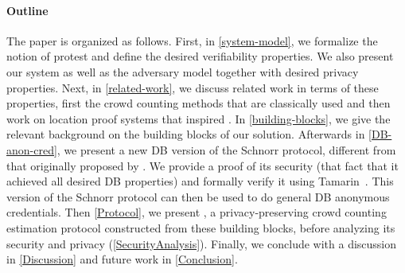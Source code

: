 \paragraph*{Outline}

The paper is organized as follows.
First, in \cref{system-model}, we formalize the notion of protest and define the desired verifiability properties.
We also present our system as well as the adversary model together with desired privacy properties.
Next, in \cref{related-work}, we discuss related work in terms of these properties, first the crowd counting methods that are classically used and then work on location proof systems that inspired \CROCUS. 
In \cref{building-blocks}, we give the relevant background on the building blocks of our solution.
Afterwards in \cref{DB-anon-cred}, we present a new \ac{DB} version of the Schnorr protocol, different from that originally proposed by \textcite{DistanceBounding}.
We provide a proof of its security (\ie that fact that it achieved all desired \ac{DB} properties) 
and formally verify it using Tamarin~\cite{TamarinDB}.
This version of the Schnorr protocol can then be used to do general \ac{DB} anonymous credentials.
Then \cref{Protocol}, we present \CROCUS, a privacy-preserving crowd counting estimation protocol constructed from these building blocks, before analyzing its security and privacy (\cref{SecurityAnalysis}).
Finally, we conclude with a discussion in \cref{Discussion} and future work in \cref{Conclusion}.
